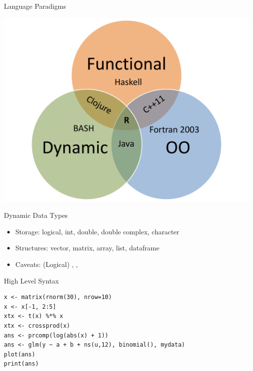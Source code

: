 \begin{frame}
  \begin{block}{Language Paradigms}\pause
  \begin{center}
    \includegraphics[scale=.35]{../common/pics/languages.pdf}
  \end{center}
  \end{block}
\end{frame}

\begin{frame}[fragile]
  \begin{block}{Dynamic Data Types}%
    \begin{itemize}%
    \item Storage:  logical, int, double, double complex, character
    \item Structures:  vector, matrix, array, list, dataframe
    \item Caveats:  (Logical) , , 
    \end{itemize}
  \end{block}
  \begin{block}{High Level Syntax}%
    \begin{lstlisting}
x <- matrix(rnorm(30), nrow=10)
x <- x[-1, 2:5]
xtx <- t(x) %*% x
xtx <- crossprod(x)
ans <- prcomp(log(abs(x) + 1))
ans <- glm(y ~ a + b + ns(u,12), binomial(), mydata)
plot(ans)
print(ans)
    \end{lstlisting}
  \end{block}
\end{frame}

